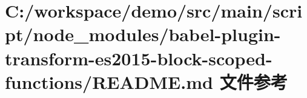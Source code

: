\hypertarget{node__modules_2babel-plugin-transform-es2015-block-scoped-functions_2_r_e_a_d_m_e_8md}{}\section{C\+:/workspace/demo/src/main/script/node\+\_\+modules/babel-\/plugin-\/transform-\/es2015-\/block-\/scoped-\/functions/\+R\+E\+A\+D\+ME.md 文件参考}
\label{node__modules_2babel-plugin-transform-es2015-block-scoped-functions_2_r_e_a_d_m_e_8md}
